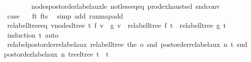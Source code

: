 \begin{isabellebody}
\ \ \ \ \ \ \ \ nodes{\isacharunderscore}{\kern0pt}postorder{\isacharunderscore}{\kern0pt}label{\isacharunderscore}{\kern0pt}aux{\isacharunderscore}{\kern0pt}le\ not{\isacharunderscore}{\kern0pt}less{\isacharunderscore}{\kern0pt}eq{\isacharunderscore}{\kern0pt}eq\ prod{\isachardot}{\kern0pt}exhaust{\isacharunderscore}{\kern0pt}sel\ snd{\isacharunderscore}{\kern0pt}conv{\isacharparenright}{\kern0pt}\isanewline
\ \ \isamarkupfalse%
\ \isamarkupfalse%
\ {\isacharquery}{\kern0pt}case\ \isamarkupfalse%
\ {}\ f{\isacharunderscore}{\kern0pt}t\ f{\isacharunderscore}{\kern0pt}ts\ \isamarkupfalse%
\ {\isacharparenleft}{\kern0pt}simp\ add{\isacharcolon}{\kern0pt}\ ran{\isacharunderscore}{\kern0pt}map{\isacharunderscore}{\kern0pt}add{\isacharparenright}{\kern0pt}\isanewline
{}\isamarkupfalse%
%
\endisatagproof
{\isafoldproof}%
%
\isadelimproof
\isanewline
%
\endisadelimproof
\isanewline
{}\isamarkupfalse%
\ relabel{\isacharunderscore}{\kern0pt}ltree{\isacharunderscore}{\kern0pt}eq{\isacharcolon}{\kern0pt}\ {\isachardoublequoteopen}{\isasymforall}v{\isasymin}nodes{\isacharunderscore}{\kern0pt}ltree\ t{\isachardot}{\kern0pt}\ f\ v\ {\isacharequal}{\kern0pt}\ g\ v\ {\isasymLongrightarrow}\ relabel{\isacharunderscore}{\kern0pt}ltree\ f\ t\ {\isacharequal}{\kern0pt}\ relabel{\isacharunderscore}{\kern0pt}ltree\ g\ t{\isachardoublequoteclose}\isanewline
%
\isadelimproof
\ \ %
\endisadelimproof
%
\isatagproof
{}\isamarkupfalse%
\ {\isacharparenleft}{\kern0pt}induction\ t{\isacharparenright}{\kern0pt}\ auto%
\endisatagproof
{\isafoldproof}%
%
\isadelimproof
\isanewline
%
\endisadelimproof
\isanewline
{}\isamarkupfalse%
\ relabel{\isacharunderscore}{\kern0pt}postorder{\isacharunderscore}{\kern0pt}relabel{\isacharunderscore}{\kern0pt}aux{\isacharcolon}{\kern0pt}\ {\isachardoublequoteopen}relabel{\isacharunderscore}{\kern0pt}ltree\ {\isacharparenleft}{\kern0pt}the\ o\ snd\ {\isacharparenleft}{\kern0pt}postorder{\isacharunderscore}{\kern0pt}relabel{\isacharunderscore}{\kern0pt}aux\ n\ t{\isacharparenright}{\kern0pt}{\isacharparenright}{\kern0pt}\ {\isacharparenleft}{\kern0pt}snd\ {\isacharparenleft}{\kern0pt}postorder{\isacharunderscore}{\kern0pt}label{\isacharunderscore}{\kern0pt}aux\ n\ {\isacharparenleft}{\kern0pt}tree{\isacharunderscore}{\kern0pt}ltree\ t{\isacharparenright}{\kern0pt}{\isacharparenright}{\kern0pt}{\isacharparenright}{\kern0pt}\ {\isacharequal}{\kern0pt}\ t{\isachardoublequoteclose}\isanewline
%
\isadelimproof
%
\endisadelimproof

\end{isabellebody}
